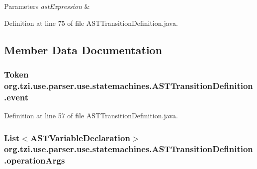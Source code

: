 \begin{DoxyParams}{Parameters}
{\em ast\-Expression} & \\
\hline
\end{DoxyParams}


Definition at line 75 of file A\-S\-T\-Transition\-Definition.\-java.



\subsection{Member Data Documentation}
\hypertarget{classorg_1_1tzi_1_1use_1_1parser_1_1use_1_1statemachines_1_1_a_s_t_transition_definition_a256a36587a333e89dfa47405b61a46b7}{
\subsubsection[{event}]{\setlength{\rightskip}{0pt plus 5cm}Token org.\-tzi.\-use.\-parser.\-use.\-statemachines.\-A\-S\-T\-Transition\-Definition.\-event\hspace{0.3cm}{\ttfamily [protected]}}}\label{classorg_1_1tzi_1_1use_1_1parser_1_1use_1_1statemachines_1_1_a_s_t_transition_definition_a256a36587a333e89dfa47405b61a46b7}


Definition at line 57 of file A\-S\-T\-Transition\-Definition.\-java.

\hypertarget{classorg_1_1tzi_1_1use_1_1parser_1_1use_1_1statemachines_1_1_a_s_t_transition_definition_a638ba3f2bde228863b24f52ac7b021dd}{
\subsubsection[{operation\-Args}]{\setlength{\rightskip}{0pt plus 5cm}List$<${\bf A\-S\-T\-Variable\-Declaration}$>$ org.\-tzi.\-use.\-parser.\-use.\-statemachines.\-A\-S\-T\-Transition\-Definition.\-operation\-Args\hspace{0.3cm}{\ttfamily [protected]}}}\label{classorg_1_1tzi_1_1use_1_1parser_1_1use_1_1statemachines_1_1_a_s_t_transition_definition_a638ba3f2bde228863b24f52ac7b021dd}


